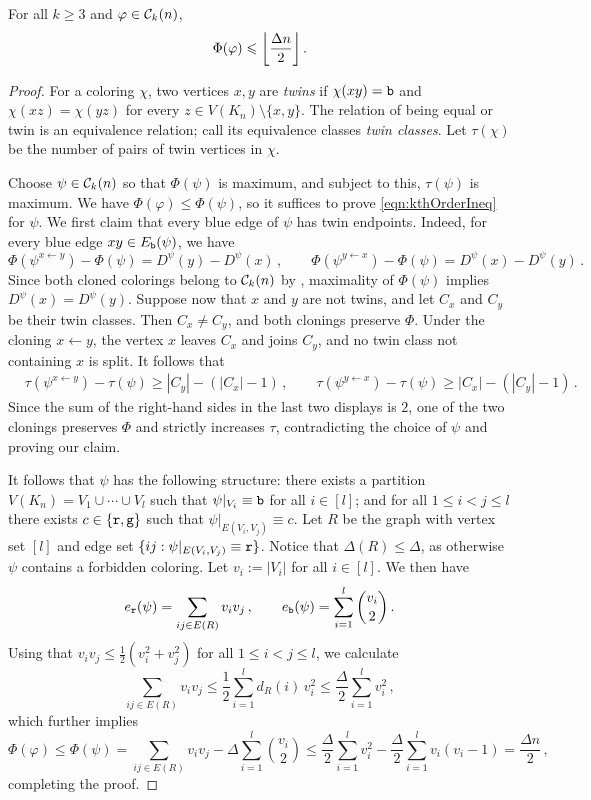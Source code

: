 \begin{lemma}\label{lemma:kthOrderMantel}
For all $k\geq3$ and $\varphi\in{\mathcal C}_k(n)$,
\begin{equation}
\Phi(\varphi)\leq\floor*{\frac{\Delta n}{2}}\,.\label{eqn:kthOrderIneq}
\end{equation}
\end{lemma}
\begin{proof}
For a coloring $\chi$, two vertices $x,y$ are \emph{twins} if $\chi(xy)={\normalfont\texttt b}$ and $\chi(xz)=\chi(yz)$ for every $z\in V(K_n)\setminus\{x,y\}$. The relation of being equal or twin is an equivalence relation; call its equivalence classes \emph{twin classes}. Let $\tau(\chi)$ be the number of pairs of twin vertices in $\chi$.

Choose $\psi\in{\mathcal C}_k(n)$ so that $\Phi(\psi)$ is maximum, and subject to this, $\tau(\psi)$ is maximum. We have $\Phi(\varphi)\leq\Phi(\psi)$, so it suffices to prove \eqref{eqn:kthOrderIneq} for $\psi$. We first claim that every blue edge of $\psi$ has twin endpoints. Indeed, for every blue edge $xy\in E_{\normalfont\texttt b}(\psi)$, we have
$$\Phi(\psi^{x\gets y})-\Phi(\psi)=D^\psi(y)-D^\psi(x)\,,\qquad \Phi(\psi^{y\gets x})-\Phi(\psi)=D^\psi(x)-D^\psi(y)\,.$$
Since both cloned colorings belong to ${\mathcal C}_k(n)$ by , maximality of $\Phi(\psi)$ implies $D^\psi(x)=D^\psi(y)$. Suppose now that $x$ and $y$ are not twins, and let $C_x$ and $C_y$ be their twin classes. Then $C_x\neq C_y$, and both clonings preserve $\Phi$. Under the cloning $x\gets y$, the vertex $x$ leaves $C_x$ and joins $C_y$, and no twin class not containing $x$ is split. It follows that
\begin{align*}
&\tau(\psi^{x\gets y})-\tau(\psi)\geq |C_y|-(|C_x|-1) \,, \qquad \tau(\psi^{y\gets x})-\tau(\psi)\geq |C_x|-(|C_y|-1)\,.
\end{align*}
Since the sum of the right-hand sides in the last two displays is $2$, one of the two clonings preserves $\Phi$ and strictly increases $\tau$, contradicting the choice of $\psi$ and proving our claim.

It follows that $\psi$ has the following structure: there exists a partition $V(K_n)=V_1\cup\cdots\cup V_l$ such that $\psi|_{V_i}\equiv{\normalfont\texttt b}$ for all $i\in[l]$; and for all $1\leq i<j\leq l$ there exists $c\in\{{\normalfont\texttt r},{\normalfont\texttt g}\}$ such that $\psi|_{E(V_i,V_j)}\equiv c$. Let $R$ be the graph with vertex set $[l]$ and edge set $\{ij:\psi|_{E(V_i,V_j)}\equiv{\normalfont\texttt r}\}$. Notice that $\Delta(R)\leq\Delta$, as otherwise $\psi$ contains a forbidden coloring. Let $v_i:=|V_i|$ for all $i\in[l]$. We then have
$$e_{\normalfont\texttt r}(\psi)=\sum_{ij\in E(R)}v_iv_j\,,\qquad e_{\normalfont\texttt b}(\psi)=\sum_{i=1}^l\binom{v_i}{2}\,.$$
Using that $v_iv_j\leq\frac{1}{2}(v_i^2+v_j^2)$ for all $1\leq i<j\leq l$, we calculate
$$\sum_{ij\in E(R)}v_iv_j\leq\frac{1}{2}\sum_{i=1}^ld_R(i)\,v_i^2\leq\frac{\Delta}{2}\sum_{i=1}^lv_i^2\,,$$
which further implies
$$\Phi(\varphi)\leq\Phi(\psi)=\sum_{ij\in E(R)}v_iv_j-\Delta\sum_{i=1}^l\binom{v_i}{2}\leq\frac{\Delta}{2}\sum_{i=1}^lv_i^2-\frac{\Delta}{2}\sum_{i=1}^lv_i(v_i-1)=\frac{\Delta n}{2}\,,$$
completing the proof.
\end{proof}

